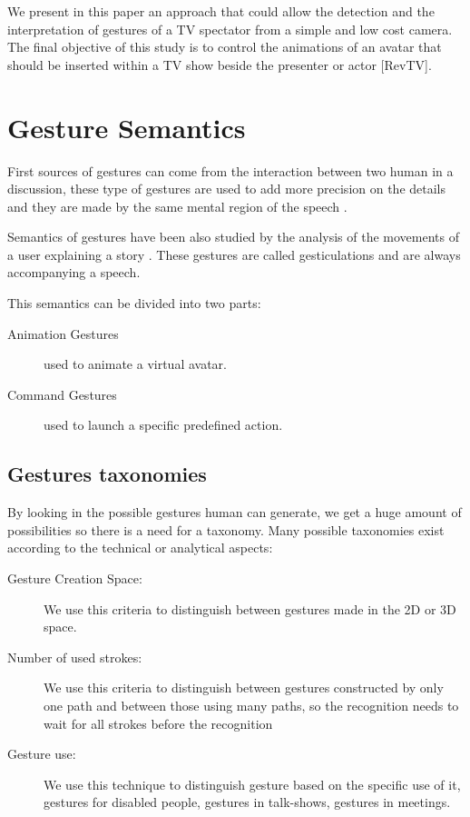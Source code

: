 \documentclass{llncs}
\newcommand\ignore[1]{}
\begin{document}
We present in this paper an approach that could allow the detection and the interpretation of gestures of a TV spectator from a simple and low cost camera. 
The final objective of this study is to control the animations of an avatar that should be inserted within a TV show beside the presenter or actor [RevTV].

\section{Gesture Semantics}
First sources of gestures can come from the interaction between two human in a
discussion, these type of gestures are used to add more precision on the details
and they are made by the same mental region of the speech \cite{SymbolicGest}.

Semantics of gestures have been also studied by the analysis of the movements of
a user explaining a story \cite{gestureThought}.
These gestures are called gesticulations and are always accompanying a speech. 

This semantics can be divided into two parts:

\begin{description}
 \item[Animation Gestures] used to animate a virtual avatar.
 \item[Command Gestures] used to launch a specific predefined action.
\end{description}


\ignore{
Gesture recognition got the attention of HCI researchers in order to find better
ways to talk to the computer. The first one was the Hand Gestural Cursor
(Put-That-There[]) aiming to the simplification of the means of communication
between human and the machine.
Since then, the gesture definition included more techniques and got applied on
the 2D recognition which is the multi-touch gestures.
}

\subsection{Gestures taxonomies}
By looking in the possible gestures human can generate\cite{Gesturecraft}, we
get a huge amount of possibilities so there is a need for a taxonomy.
Many possible taxonomies exist according to the technical or analytical aspects:
\begin{description}
 \item[Gesture Creation Space:] We use this criteria to distinguish between gestures made in the 2D or 3D space.
 \item[Number of used strokes:] We use this criteria to distinguish between gestures constructed by only one path and between those using many paths, so the recognition needs to wait for all strokes before the recognition
 \item[Gesture use:] We use this technique to distinguish gesture based on the specific use of it, gestures for disabled people, gestures in talk-shows, gestures in meetings.
\end{description}
\end{document}

